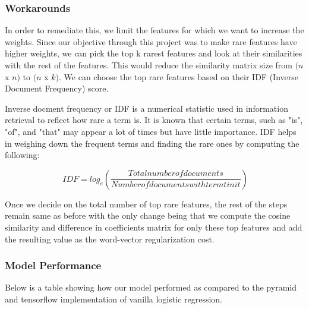 \subsubsection{Workarounds}

In order to remediate this, we limit the features for which we want to increase the weights. Since our objective through this project was to make rare features have higher weights, we can pick the top k rarest features and look at their similarities with the rest of the features. This would reduce the similarity matrix size from $(n$ x $n)$ to $(n$ x $k)$. We can choose the top rare features based on their IDF (Inverse Document Frequency) score.

Inverse docment frequency or IDF is a numerical statistic used in information retrieval to reflect how rare a term is. It is known that certain terms, such as "is", "of", and "that" may appear a lot of times but have little importance. IDF helps in weighing down the frequent terms and finding the rare ones by computing the following:

\begin{equation}
\ IDF = log_e (\frac{Total number of documents}{Number of documents with term t in it})
\end{equation}

Once we decide on the total number of top rare features, the rest of the steps remain same as before with the only change being that we compute the cosine similarity and difference in coefficients matrix for only these top features and add the resulting value as the word-vector regularization cost.

\iffalse
\newpage
\subsubsection{Model Performance}

Below is a table showing how our model performed as compared to the pyramid and tensorflow implementation of vanilla logistic regression.

